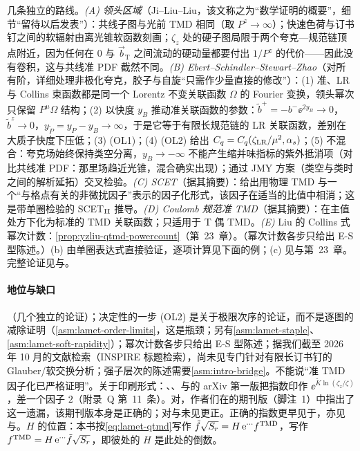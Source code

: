 \begin{proofsketch}
几条独立的路线。\emph{(A) 领头区域}（Ji--Liu--Liu\cite{Ji:2019ewn}，该文称之为“数学证明的概要”，细节“留待以后发表”）：共线子图与光前 TMD 相同（取 $P^z\to\infty$）；快速色荷与订书钉之间的软辐射由离光锥软函数刻画；$\zeta_z$ 处的硬子图局限于两个夸克—规范链顶点附近，因为任何在 $0$ 与 $\vec b_{\mathrm T}$ 之间流动的硬动量都要付出 $1/P^z$ 的代价——因此没有卷积，这与共线准 PDF 截然不同。\emph{(B) Ebert--Schindler--Stewart--Zhao}\cite{Ebert:2022fmh}（对所有阶，详细处理非极化夸克，胶子与自旋“只需作少量直接的修改”）：(1) 准、LR 与 Collins 束函数都是同一个 Lorentz 不变关联函数 $\Omega$ 的 Fourier 变换，领头幂次只保留 $P^\mu\Omega$ 结构；(2) 以快度 $y_B$ 推动准关联函数的参数：$\tilde b^+=-b^-\ee^{2y_B}\to0$，$\tilde b^z\to0$，$y_{\tilde P}=y_P-y_B\to\infty$，于是它等于有限长规范链的 LR 关联函数，差别在大质子快度下压低；(3) (OL1)；(4) (OL2) 给出 $C_q=C_q(\zeta_{\rm LR}/\mu^2,\alpha_s)$；(5) 不混合：夸克场始终保持类空分离，$y_B\to-\infty$ 不能产生缩并味指标的紫外抵消项（对比共线准 PDF：那里场趋近光锥，混合确实出现）；通过 JMY 方案（类空与类时之间的解析延拓）交叉检验。\emph{(C) SCET}\cite{Vladimirov:2020ofp}（据其摘要）：给出用物理 TMD 与一个“与格点有关的非微扰因子”表示的因子化形式，该因子在适当的比值中相消；这是带单圈检验的 SCET$_{\rm II}$ 推导。\emph{(D) Coulomb 规范准 TMD}\cite{Zhao:2023ptv}（据其摘要）：在主值处方下化为标准的 TMD 关联函数；只适用于 T 偶 TMD。\emph{(E)} Liu 的 Collins 式幂次计数：\cref{prop:yzliu-qtmd-powercount}（第~23~章）。（幂次计数各步只给出 E-S 型陈述。）(b) 由单圈表达式直接验证，逐项计算见下面的例；(c) 见\cite{delRio:2023pse}与第~23~章。完整论证见\cite{Ji:2019ewn}与\cite{Ebert:2022fmh}。
\end{proofsketch}

\paragraph{地位与缺口}
\tagA（几个独立的论证）；决定性的一步 (OL2) 是关于极限次序的论证，而不是逐图的减除证明（\cref{asm:lamet-order-limits}，这是瓶颈；另有\cref{asm:lamet-staple}、\cref{asm:lamet-soft-rapidity}）；幂次计数各步只给出 E-S 型陈述；据我们截至 2026 年 10 月的文献检索（INSPIRE 标题检索），尚未见专门针对有限长订书钉的 Glauber/软交换分析；强子层次的陈述需要\cref{asm:intro-bridge}。不能说“准 TMD 因子化已严格证明”。关于印刷形式：\cite[式~(22)]{Ji:2019ewn}、\cite[式~(209)--(210)]{JiEtAl2021}、\cite[式~(53)、(75)]{Liu:2022nnk}与\cite{Ji:2021znw}的 arXiv 第一版把指数印作 $\ee^{\tilde K\ln(\zeta_z/\zeta)}$，差一个因子 $2$（附录~Q 第~11~条）。对\cite{JiEtAl2021}，作者们在\cite{Ji:2021znw}的期刊版（脚注~1）中指出了这一遗漏，该期刊版本身是正确的；对\cite[式~(22)]{Ji:2019ewn}与\cite[式~(53)、(75)]{Liu:2022nnk}未见更正。正确的指数更早见于\cite[式~(24)、(27)]{EbertStewartZhao2019}，亦见\cite{Ebert:2022fmh}与\cite[式~(52)]{Liu:2022nnk}。$H$ 的位置：本书按\cref{eq:lamet-qtmd}写作 $\tilde f\sqrt{S_r}=H\,\mathrm{e}^{\cdots}f^{\rm TMD}$，\cite[式~(209)]{JiEtAl2021}写作 $f^{\rm TMD}=H\,\mathrm{e}^{\cdots}\tilde f\sqrt{S_r}$，即彼处的 $H$ 是此处的倒数。

